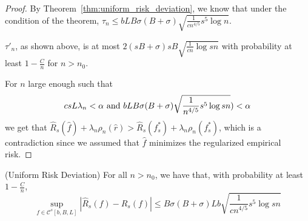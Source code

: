 \begin{proof}
By Theorem~\ref{thm:uniform_risk_deviation}, we know that under the condition of the theorem, $\tau_n \leq  bLB\sigma(B+\sigma)\sqrt{ \frac{1}{cn^{4/5}} s^5 \log n}$.


$\tau'_n$, as shown above, is at most $2 (sB+\sigma) sB \sqrt{\frac{1}{cn} \log sn}$ with probability at least $1-\frac{C}{n}$ for $n > n_0$.


For $n$ large enough such that
\[
c s L \lambda_n < \alpha \textrm{ and } bLB\sigma(B+\sigma) \sqrt{ \frac{1}{n^{4/5}} s^5 \log sn}) < \alpha
\]
we get that $\hat{R}_s(\hat{f}) + \lambda_n \rho_n(\hat{r}) > \hat{R}_s(f^*_s) + \lambda_n \rho_n(f^*_s)$, which is a contradiction since we assumed that $\hat{f}$ minimizes the regularized empirical risk.

\end{proof}

%

\begin{theorem} (Uniform Risk Deviation)
\label{thm:uniform_risk_deviation}
For all $n > n_0$, we have that, with probability at least $1 - \frac{C}{n}$, 
\[
\sup_{f \in \mathcal{C}^s[b,B,L]} |\hat{R}_s(f) - R_s(f)| \leq B\sigma(B+\sigma)Lb\sqrt{ \frac{1}{cn^{4/5}} s^5 \log sn}
\]
\end{theorem}


